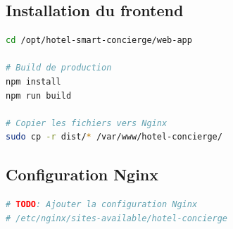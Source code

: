 \subsection*{Installation du frontend}

\begin{lstlisting}[language=bash]
cd /opt/hotel-smart-concierge/web-app

# Build de production
npm install
npm run build

# Copier les fichiers vers Nginx
sudo cp -r dist/* /var/www/hotel-concierge/
\end{lstlisting}

\subsection*{Configuration Nginx}

\begin{lstlisting}[language=bash]
# TODO: Ajouter la configuration Nginx
# /etc/nginx/sites-available/hotel-concierge
\end{lstlisting}

